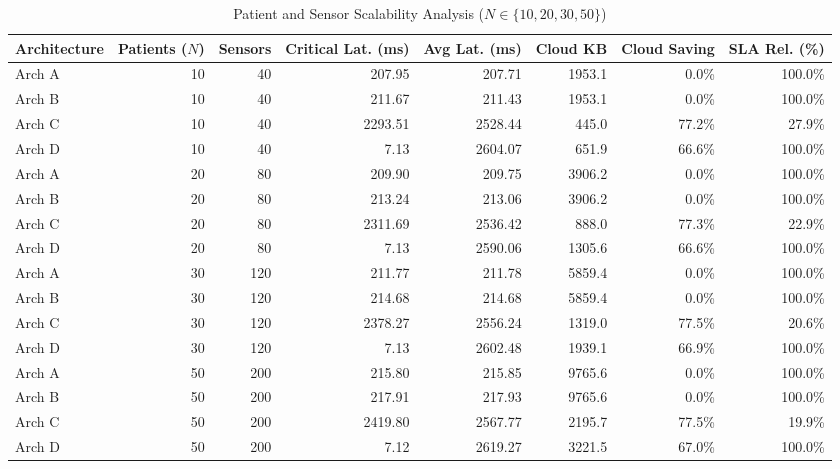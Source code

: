 \begin{table}[t]
\centering
\caption{Patient and Sensor Scalability Analysis ($N \in \{10, 20, 30, 50\}$)}
\label{tab:scalability}
\begin{tabular}{lrrrrrrr}
\toprule
\textbf{Architecture} & \textbf{Patients ($N$)} & \textbf{Sensors} & \textbf{Critical Lat. (ms)} & \textbf{Avg Lat. (ms)} & \textbf{Cloud KB} & \textbf{Cloud Saving} & \textbf{SLA Rel. (\%)} \\
\midrule
Arch A & 10 & 40 & 207.95 & 207.71 & 1953.1 & 0.0\% & 100.0\% \\
Arch B & 10 & 40 & 211.67 & 211.43 & 1953.1 & 0.0\% & 100.0\% \\
Arch C & 10 & 40 & 2293.51 & 2528.44 & 445.0 & 77.2\% & 27.9\% \\
Arch D & 10 & 40 & 7.13 & 2604.07 & 651.9 & 66.6\% & 100.0\% \\
Arch A & 20 & 80 & 209.90 & 209.75 & 3906.2 & 0.0\% & 100.0\% \\
Arch B & 20 & 80 & 213.24 & 213.06 & 3906.2 & 0.0\% & 100.0\% \\
Arch C & 20 & 80 & 2311.69 & 2536.42 & 888.0 & 77.3\% & 22.9\% \\
Arch D & 20 & 80 & 7.13 & 2590.06 & 1305.6 & 66.6\% & 100.0\% \\
Arch A & 30 & 120 & 211.77 & 211.78 & 5859.4 & 0.0\% & 100.0\% \\
Arch B & 30 & 120 & 214.68 & 214.68 & 5859.4 & 0.0\% & 100.0\% \\
Arch C & 30 & 120 & 2378.27 & 2556.24 & 1319.0 & 77.5\% & 20.6\% \\
Arch D & 30 & 120 & 7.13 & 2602.48 & 1939.1 & 66.9\% & 100.0\% \\
Arch A & 50 & 200 & 215.80 & 215.85 & 9765.6 & 0.0\% & 100.0\% \\
Arch B & 50 & 200 & 217.91 & 217.93 & 9765.6 & 0.0\% & 100.0\% \\
Arch C & 50 & 200 & 2419.80 & 2567.77 & 2195.7 & 77.5\% & 19.9\% \\
Arch D & 50 & 200 & 7.12 & 2619.27 & 3221.5 & 67.0\% & 100.0\% \\
\bottomrule
\end{tabular}
\end{table}

